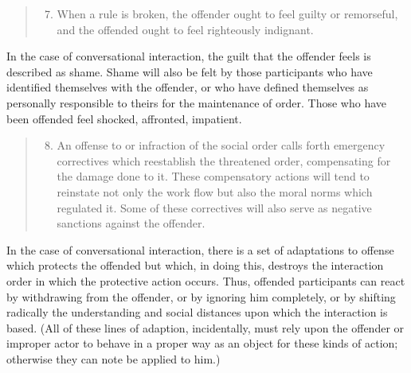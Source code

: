 \documentclass[openany,nobib]{tufte-book}
\begin{document}
\begin{quote}
\begin{enumerate}
\setcounter{enumi}{6}
\item
  When a rule is broken, the offender ought to feel guilty or
  remorseful, and the offended ought to feel righteously indignant.
\end{enumerate}
\end{quote}

\noindent In the case of conversational interaction, the guilt that the offender
feels is described as shame. Shame will also be felt by those
participants who have identified themselves with the offender, or who
have defined themselves as personally responsible to theirs for the
maintenance of order. Those who have been offended feel shocked,
affronted, impatient.

\begin{quote}
\begin{enumerate}
\setcounter{enumi}{7}
\item
  An offense to or infraction of the social order calls forth emergency
  correctives which reestablish the threatened order, compensating for
  the damage done to it. These compensatory actions will tend to
  reinstate not only the work flow but also the moral norms which
  regulated it. Some of these correctives will also serve as negative
  sanctions against the offender.
\end{enumerate}
\end{quote}

\noindent In the case of conversational interaction, there is a set of adaptations
to offense which protects the offended but which, in doing this,
destroys the interaction order in which the protective action occurs.
Thus, offended participants can react by withdrawing from the offender,
or by ignoring him completely, or by shifting radically the
understanding and social distances upon which the interaction is based.
(All of these lines of adaption, incidentally, must rely upon the
offender or improper actor to behave in a proper way as an object for
these kinds of action; otherwise they can note be applied to him.)
\end{document}
